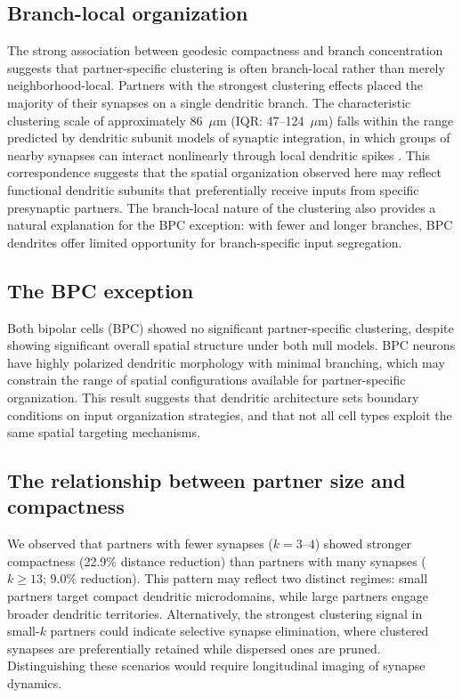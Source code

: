 \subsection{Branch-local organization}

The strong association between geodesic compactness and branch concentration suggests that partner-specific clustering is often branch-local rather than merely neighborhood-local. Partners with the strongest clustering effects placed the majority of their synapses on a single dendritic branch. The characteristic clustering scale of approximately 86~$\mu$m (IQR: 47--124~$\mu$m) falls within the range predicted by dendritic subunit models of synaptic integration, in which groups of nearby synapses can interact nonlinearly through local dendritic spikes \citep{schiller2000,poirazi2003}. This correspondence suggests that the spatial organization observed here may reflect functional dendritic subunits that preferentially receive inputs from specific presynaptic partners. The branch-local nature of the clustering also provides a natural explanation for the BPC exception: with fewer and longer branches, BPC dendrites offer limited opportunity for branch-specific input segregation.

\subsection{The BPC exception}

Both bipolar cells (BPC) showed no significant partner-specific clustering, despite showing significant overall spatial structure under both null models. BPC neurons have highly polarized dendritic morphology with minimal branching, which may constrain the range of spatial configurations available for partner-specific organization. This result suggests that dendritic architecture sets boundary conditions on input organization strategies, and that not all cell types exploit the same spatial targeting mechanisms.

\subsection{The relationship between partner size and compactness}

We observed that partners with fewer synapses ($k = 3$--$4$) showed stronger compactness (22.9\% distance reduction) than partners with many synapses ($k \geq 13$; 9.0\% reduction). This pattern may reflect two distinct regimes: small partners target compact dendritic microdomains, while large partners engage broader dendritic territories. Alternatively, the strongest clustering signal in small-$k$ partners could indicate selective synapse elimination, where clustered synapses are preferentially retained while dispersed ones are pruned. Distinguishing these scenarios would require longitudinal imaging of synapse dynamics.

